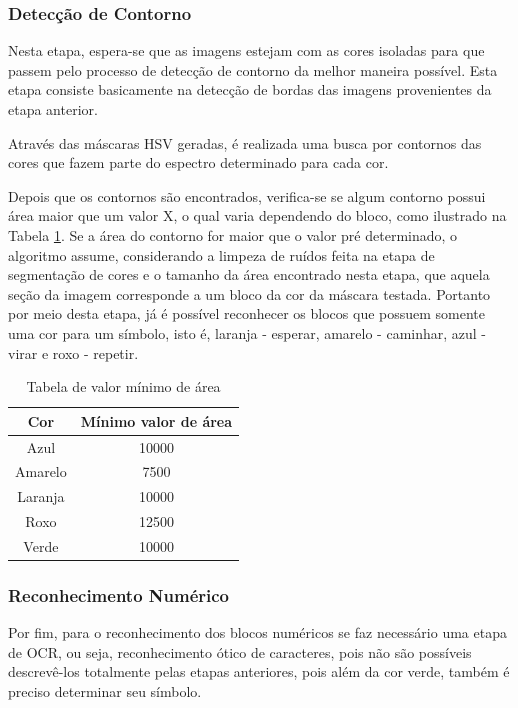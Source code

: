     \subsubsection{Detecção de Contorno}
    Nesta etapa, espera-se que as imagens estejam com as cores isoladas para que passem pelo processo de detecção de contorno da melhor maneira possível. Esta etapa consiste basicamente na detecção de bordas das imagens provenientes da etapa anterior.

    Através das máscaras HSV geradas, é realizada uma busca por contornos das cores que fazem parte do espectro determinado para cada cor.
    
    Depois que os contornos são encontrados, verifica-se se algum contorno possui área maior que um valor X, o qual varia dependendo do bloco, como ilustrado na Tabela \ref{table:area_values}. Se a área do contorno for maior que o valor pré determinado, o algoritmo assume, considerando a limpeza de ruídos feita na etapa de segmentação de cores e o tamanho da área encontrado nesta etapa, que aquela seção da imagem corresponde a um bloco da cor da máscara testada. Portanto por meio desta etapa, já é possível reconhecer os blocos que possuem somente uma cor para um símbolo, isto é, laranja - esperar, amarelo - caminhar, azul - virar e roxo - repetir.
    
    \begin{table}[H]
        \centering
        \caption{Tabela de valor mínimo de área}
        \label{table:area_values}
        \begin{tabular}{ |c|c| } 
         \hline
        Cor     & Mínimo valor de área \\
         \hline
        Azul    & 10000                \\
         \hline
        Amarelo & 7500                 \\
         \hline
        Laranja & 10000                \\
         \hline
        Roxo    & 12500                \\
         \hline
        Verde   & 10000                \\    [0.5ex]    
         \hline
        
        \end{tabular}
        
    \end{table}
    
        
    \subsubsection{Reconhecimento Numérico}
    Por fim, para o reconhecimento dos blocos numéricos se faz necessário uma etapa de OCR, ou seja, reconhecimento ótico de caracteres, pois não são possíveis descrevê-los totalmente pelas etapas anteriores, pois além da cor verde, também é preciso determinar seu símbolo.
    
